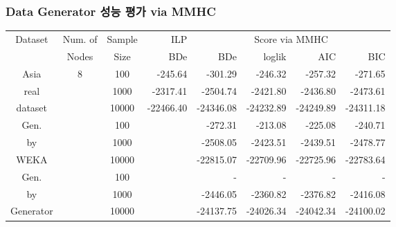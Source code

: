 \documentclass{beamer}
\begin{document}
\begin{frame}
\frametitle{Data Generator 성능 평가 via MMHC}
{\scriptsize{}

\begin{center}
\begin{tabular}{c|c|c|r|r|r|r|r}
\hline 
\multirow{2}{*}{{\tiny{}Dataset}} & {\tiny{}Num. of} & {\tiny{}Sample} & {\tiny{}ILP} & \multicolumn{4}{c}{{\tiny{}Score via MMHC}}\tabularnewline
\cline{4-8} 
 & {\tiny{}Nodes} & {\tiny{}Size} & {\tiny{}BDe} & {\tiny{}BDe} & {\tiny{}loglik} & {\tiny{}AIC} & {\tiny{}BIC}\tabularnewline
\hline 
{\tiny{}Asia} & \multirow{9}{*}{{\tiny{}8}} & {\tiny{}100} & {\tiny{}-245.64} & {\tiny{}-301.29} & {\tiny{}-246.32} & {\tiny{}-257.32} & {\tiny{}-271.65}\tabularnewline
{\tiny{}real} &  & {\tiny{}1000} & {\tiny{}-2317.41} & {\tiny{}-2504.74} & {\tiny{}-2421.80} & {\tiny{}-2436.80} & {\tiny{}-2473.61}\tabularnewline
{\tiny{}dataset} &  & {\tiny{}10000} & {\tiny{}-22466.40} & {\tiny{}-24346.08} & {\tiny{}-24232.89} & {\tiny{}-24249.89} & {\tiny{}-24311.18}\tabularnewline
\cline{1-1} \cline{3-8} 
{\tiny{}Gen.} &  & {\tiny{}100} &  & {\tiny{}-272.31} & {\tiny{}-213.08} & {\tiny{}-225.08} & {\tiny{}-240.71}\tabularnewline
{\tiny{}by} &  & {\tiny{}1000} &  & {\tiny{}-2508.05} & {\tiny{}-2423.51} & {\tiny{}-2439.51} & {\tiny{}-2478.77}\tabularnewline
{\tiny{}WEKA} &  & {\tiny{}10000} &  & {\tiny{}-22815.07} & {\tiny{}-22709.96} & {\tiny{}-22725.96} & {\tiny{}-22783.64}\tabularnewline
\cline{1-1} \cline{3-8} 
{\tiny{}Gen.} &  & {\tiny{}100} &  & {\tiny{}-} & {\tiny{}-} & {\tiny{}-} & {\tiny{}-}\tabularnewline
{\tiny{}by} &  & {\tiny{}1000} &  & {\tiny{}-2446.05} & {\tiny{}-2360.82} & {\tiny{}-2376.82} & {\tiny{}-2416.08}\tabularnewline
{\tiny{}Generator} &  & {\tiny{}10000} &  & {\tiny{}-24137.75} & {\tiny{}-24026.34} & {\tiny{}-24042.34} & {\tiny{}-24100.02}\tabularnewline
\hline 
\end{tabular}
\end{center}
}
\end{frame}
\end{document}

